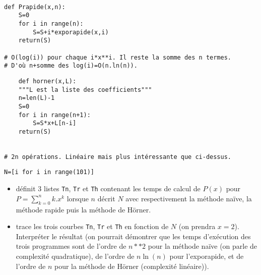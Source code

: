 	
\begin{lstlisting}

def Prapide(x,n):
    S=0
    for i in range(n):
        S=S+i*exporapide(x,i)
    return(S)

# O(log(i)) pour chaque i*x**i. Il reste la somme des n termes.
# D'où n+somme des log(i)=O(n.ln(n)).

\end{lstlisting}

	
	
	\begin{lstlisting}
	def horner(x,L):
    """L est la liste des coefficients"""
    n=len(L)-1
    S=0
    for i in range(n+1):
        S=S*x+L[n-i]
    return(S)
    
    
# 2n opérations. Linéaire mais plus intéressante que ci-dessus.

\end{lstlisting}



	
	
\begin{lstlisting}
N=[i for i in range(101)]
\end{lstlisting}

\begin{itemize}
\item définit 3 listes \texttt{Tn}, \texttt{Tr} et \texttt{Th} contenant les temps de calcul de $P(x)$ pour $P=\displaystyle\sum_{k=0}^n k.x^k$ lorsque $n$ décrit $N$ avec respectivement la méthode naïve, la méthode rapide puis la méthode de Hörner.\\
\item trace les trois courbes  \texttt{Tn}, \texttt{Tr} et \texttt{Th} en fonction de $N$ (on prendra $x=2$). Interpréter le résultat (on pourrait démontrer que les temps d'exécution des trois programmes sont de l'ordre de $n**2$ pour la méthode naïve (on parle de complexité quadratique), de l'ordre de $n\ln(n)$ pour l'exporapide, et de l'ordre de $n$ pour la méthode de Hörner (complexité linéaire)). 
\end{itemize}


